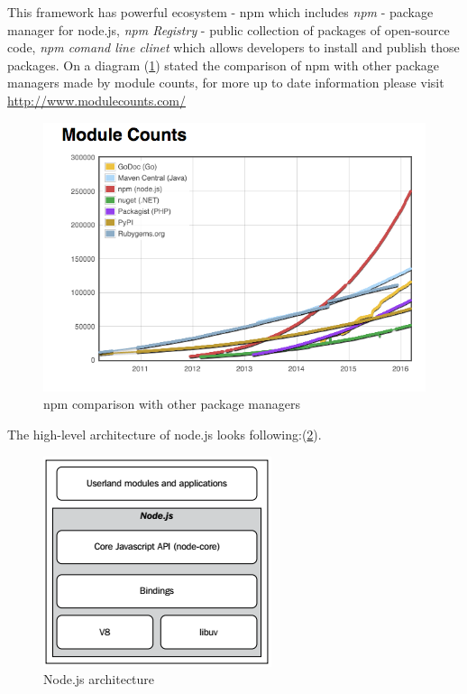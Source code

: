 This framework has powerful ecosystem - npm which includes \textit{npm} - package manager for node.js, \textit{npm Registry} - public collection of packages of open-source code, \textit{npm comand line clinet} which allows developers to install and publish those packages. On a diagram (\ref{fig:npmStat}) stated the comparison of npm with other package managers made by module counts, for more up to date information please visit \url{http://www.modulecounts.com/}
\begin{figure}[ht]
  	\label{fig:npmStat}
    \centering
    \includegraphics[width=\textwidth]{grafiken/modulecounts.png}
     \caption{npm comparison with other package managers\cite{moduleCounts}}
  \end{figure}

The high-level architecture of node.js looks following:(\ref{fig:nodeArch}). 
\begin{figure}[ht]
  	\label{fig:nodeArch}
    \centering
    \includegraphics[scale=1.0]{grafiken/nodeArchitecture.png}
     \caption{Node.js architecture \cite{nodejsbook}}
  \end{figure}

